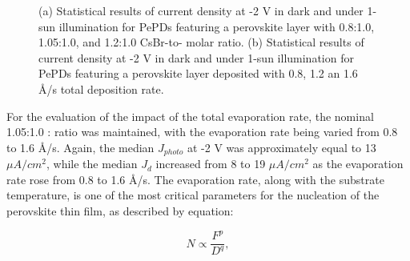 \begin{figure}[htbp]
\begin{subfigure}[t]{0.45\textwidth}
        \caption{}
        \label{fig:etl:opt:evap_rate}
    \end{subfigure}    
    \caption{(a) Statistical results of current density at -2 V in dark and under 1-sun illumination for PePDs featuring a perovskite layer with 0.8:1.0, 1.05:1.0, and 1.2:1.0 CsBr-to- molar ratio. (b) Statistical results of current density at -2 V in dark and under 1-sun illumination for PePDs featuring a perovskite layer deposited with 0.8, 1.2 an 1.6 \AA/s total deposition rate. }
    \label{fig:etl_opt:molar_and_rate}
\end{figure}


For the evaluation of the impact of the total evaporation rate, the nominal 1.05:1.0 : ratio was maintained, with the evaporation rate being varied from 0.8 to 1.6 \AA/s. Again, the median $J_{photo}$ at -2 V was approximately equal to 13 $\mu A/cm^2$, while the median $J_d$ increased from 8 to 19 $\mu A/cm^2$ as the evaporation rate rose from 0.8 to 1.6 \AA/s. The evaporation rate, along with the substrate temperature, is one of the most critical parameters for the nucleation of the perovskite thin film, as described by equation: 

\begin{equation}
    N \propto \frac{F^p}{D^q}, 
\end{equation}

